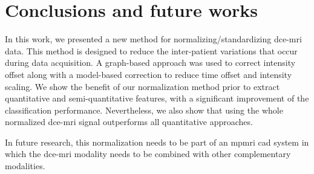\section{Conclusions and future works}\label{sec:conclusions}

In this work, we presented a new method for normalizing/standardizing \ac{dce}-\ac{mri} data.
This method is designed to reduce the inter-patient variations that occur during data acquisition.
A graph-based approach was used to correct intensity offset along with a model-based correction to reduce time offset and intensity scaling.
We show the benefit of our normalization method prior to extract quantitative and semi-quantitative features, with a significant improvement of the classification performance.
Nevertheless, we also show that using the whole normalized \ac{dce}-\ac{mri} signal outperforms all quantitative approaches.

In future research, this normalization needs to be part of an
\ac{mpmri} \ac{cad} system in which the \ac{dce}-\ac{mri} modality needs to be combined with other complementary modalities.

